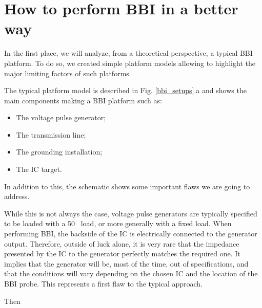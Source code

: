 
\section{How to perform BBI in a better way}
	In the first place, we will analyze, from a theoretical perspective, a typical BBI platform.
	To do so, we created simple platform models allowing to highlight the major limiting factors of such platforms.
	
	The typical platform model is described in Fig. \ref{bbi_setups}.a and shows the main components making a BBI platform such as:
	\begin{itemize}
		\item The voltage pulse generator;
		\item The transmission line;
		\item The grounding installation;
		\item The IC target.
	\end{itemize}
	In addition to this, the schematic shows some important flaws we are going to address.
	
	While this is not always the case, voltage pulse generators are typically specified to be loaded with a 50 \textOmega\ load, or more generally with a fixed load.
	When performing BBI, the backside of the IC is electrically connected to the generator output.
	Therefore, outside of luck alone, it is very rare that the impedance presented by the IC to the generator perfectly matches the required one.
	It implies that the generator will be, most of the time, out of specifications, and that the conditions will vary depending on the chosen IC and the location of the BBI probe.
	This represents a first flaw to the typical approach.
	
	Then
	
